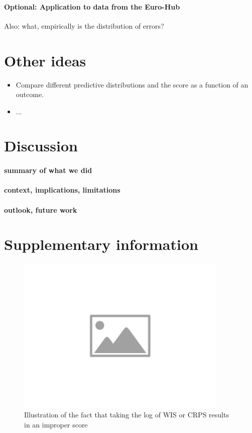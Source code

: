 \documentclass{article}
\begin{document}
\paragraph{Optional: Application to data from the Euro-Hub}
Also: what, empirically is the distribution of errors? 

\section{Other ideas}
\begin{itemize}
    \item Compare different predictive distributions and the score as a function of an outcome.
    \item ...
\end{itemize}




\section{Discussion}

\paragraph{summary of what we did}

\paragraph{context, implications, limitations}

\paragraph{outlook, future work}


 




\newpage

\appendix
\section{Supplementary information}

\begin{figure}[h!]
    \centering
    \includegraphics[width=0.9\textwidth]{output/placeholder-image.png}
    \caption{Illustration of the fact that taking the log of WIS or CRPS results in an improper score}
    \label{fig:log-improper}
\end{figure}
\end{document}

